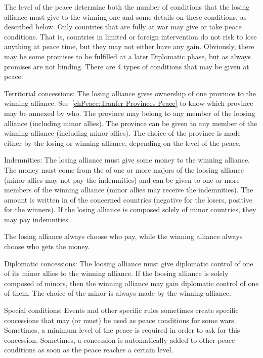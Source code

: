  The level of the peace determine both the number of
conditions that the losing alliance must give to the winning one and some
details on these conditions, as described below.
\bparag Only countries that are fully at war may give or take peace
conditions. That is, countries in limited or foreign intervention do not risk
to lose anything at peace time, but they may not either have any
gain. Obviously, there may be some promises to be fulfilled at a later
Diplomatic phase, but as always promises are not binding.
\bparag There are 4 types of conditions that may be given at peace:
\begin{modlist}
\item[Territorial concessions:] The losing alliance gives ownership of one
  province to the winning alliance. See~\ref{chPeace:Tranfer Provinces Peace}
  to know which province may be annexed by who. The province may belong to any
  member of the loosing alliance (including minor allies). The province can be
  given to any member of the winning alliance (including minor allies). The
  choice of the province is made either by the losing or winning alliance,
  depending on the level of the peace.
\item[Indemnities:] The losing alliance must give some money to the winning
  alliance. The money must come from the \RT of one or more majors of the
  loosing alliance (minor allies may not pay the indemnities) and can be given
  to one or more members of the winning alliance (minor allies may receive the
  indemnities). The amount is written in  of the
  concerned countries (negative for the losers, positive for the winners). If
  the losing alliance is composed solely of minor countries, they may pay
  indemnities.

  The losing alliance always choose who pay, while the winning alliance always
  choose who gets the money.
\item[Diplomatic concessions:] The loosing alliance must give diplomatic
  control of one of its minor allies to the winning alliance. If the loosing
  alliance is solely composed of minors, then the winning alliance may gain
  diplomatic control of one of them. The choice of the minor is always made by
  the winning alliance.
\item[Special conditions:] Events and other specific rules sometimes create
  specific concessions that may (or must) be used as peace conditions for some
  wars. Sometimes, a minimum level of the peace is required in order to ask
  for this concession. Sometimes, a concession is automatically added to other
  peace conditions as soon as the peace reaches a certain level.
\end{modlist}

